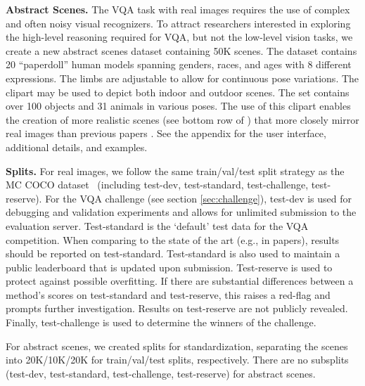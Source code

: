 \textbf{Abstract Scenes.}
The VQA task with real images requires the use of complex and often noisy
visual recognizers. To attract researchers interested in exploring the high-level reasoning
required for VQA, but not the low-level vision tasks, we create a new abstract scenes
dataset \cite{Antol2014,ZitnickCVPR2013,ZitnickICCV2013,VedantamPAMI2015} containing 50K scenes.
The dataset contains 20 ``paperdoll'' human models \cite{Antol2014} spanning genders, races,
and ages with 8 different expressions. The limbs are adjustable to allow
for continuous pose variations. The clipart may be used to depict both
indoor and outdoor scenes. The set contains over 100 objects and 31 animals in
various poses. The use of this clipart enables the creation of more realistic scenes (see bottom row of ) that more closely mirror
real images than previous papers \cite{ZitnickCVPR2013,ZitnickICCV2013,VedantamPAMI2015}.
See the appendix
for the user interface, additional details, and examples. 

\textbf{Splits.}
For real images, we follow the same train/val/test split strategy as the MC COCO dataset~\cite{coco} 
(including test-dev, test-standard, test-challenge, test-reserve). For the VQA challenge (see section \ref{sec:challenge}), test-dev is used for debugging and validation experiments and allows for unlimited submission to the evaluation server. Test-standard is the `default' test data for the VQA competition. When comparing to the state of the art (e.g., in papers), results should be reported on test-standard. Test-standard is also used to maintain a public leaderboard that is updated upon submission. Test-reserve is used to protect against possible overfitting. If there are substantial differences between a method's scores on test-standard and test-reserve, this raises a red-flag and prompts further investigation. Results on test-reserve are not publicly revealed. Finally, test-challenge is used to determine the winners of the challenge.

For abstract scenes, we created splits for standardization, separating the scenes into 20K/10K/20K for train/val/test splits, respectively. There are no subsplits (test-dev, test-standard, test-challenge, test-reserve) for abstract scenes.


